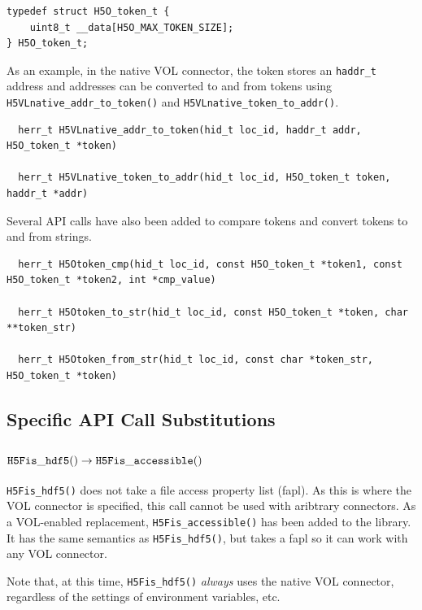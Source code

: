 \begin{lstlisting}
typedef struct H5O_token_t {                                                     
    uint8_t __data[H5O_MAX_TOKEN_SIZE];                                          
} H5O_token_t;
\end{lstlisting}

As an example, in the native VOL connector, the token stores an {\tt haddr\_t}
address and addresses can be converted to and from tokens using
{\tt H5VLnative\_addr\_to\_token()} and {\tt H5VLnative\_token\_to\_addr()}.

\begin{lstlisting}
  herr_t H5VLnative_addr_to_token(hid_t loc_id, haddr_t addr, H5O_token_t *token)

  herr_t H5VLnative_token_to_addr(hid_t loc_id, H5O_token_t token, haddr_t *addr)
\end{lstlisting}

Several API calls have also been added to compare tokens and convert tokens to
and from strings.

\begin{lstlisting}
  herr_t H5Otoken_cmp(hid_t loc_id, const H5O_token_t *token1, const H5O_token_t *token2, int *cmp_value)

  herr_t H5Otoken_to_str(hid_t loc_id, const H5O_token_t *token, char **token_str)

  herr_t H5Otoken_from_str(hid_t loc_id, const char *token_str, H5O_token_t *token)
\end{lstlisting}


\subsection{Specific API Call Substitutions}


\subsubsection{${\tt H5Fis\_hdf5()} \rightarrow {\tt H5Fis\_accessible()}$}

{\tt H5Fis\_hdf5()} does not take a file access property list (fapl). As this is where the VOL connector is specified, this call cannot be used with aribtrary connectors. As a VOL-enabled replacement, {\tt H5Fis\_accessible()} has been added to the library. It has the same semantics as {\tt H5Fis\_hdf5()}, but takes a fapl so it can work with any VOL connector.

Note that, at this time, {\tt H5Fis\_hdf5()} \textit{always} uses the native VOL connector, regardless of the settings of environment variables, etc.

